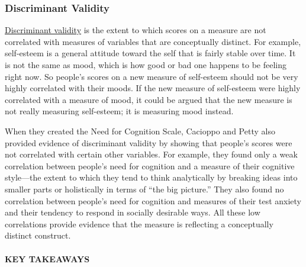\documentclass[
]{krantz}
\begin{document}
\hypertarget{discriminant-validity}{%
\subsubsection*{Discriminant Validity}\label{discriminant-validity}}


\protect\hyperlink{discriminant-validity-1}{Discriminant validity} is the extent to which scores on a measure are not correlated with measures of variables that are conceptually distinct. For example, self-esteem is a general attitude toward the self that is fairly stable over time. It is not the same as mood, which is how good or bad one happens to be feeling right now. So people's scores on a new measure of self-esteem should not be very highly correlated with their moods. If the new measure of self-esteem were highly correlated with a measure of mood, it could be argued that the new measure is not really measuring self-esteem; it is measuring mood instead.

When they created the Need for Cognition Scale, Cacioppo and Petty also provided evidence of discriminant validity by showing that people's scores were not correlated with certain other variables. For example, they found only a weak correlation between people's need for cognition and a measure of their cognitive style---the extent to which they tend to think analytically by breaking ideas into smaller parts or holistically in terms of ``the big picture.'' They also found no correlation between people's need for cognition and measures of their test anxiety and their tendency to respond in socially desirable ways. All these low correlations provide evidence that the measure is reflecting a conceptually distinct construct.

\hypertarget{key-takeaways-15}{%
\paragraph*{KEY TAKEAWAYS}\label{key-takeaways-15}}
\end{document}
